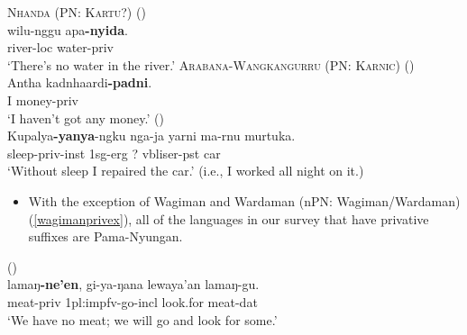 \documentclass{article}
\begin{document}


\begin{exe}
  \ex \textsc{Nhanda (PN: Kartu?)} (\citealt[64]{blevins01}) \label{privexist1}\\
  \gll wilu-nggu apa\textbf{-nyida}.\\
  river-{\sc loc} water-{\sc priv}\\
  \glt `There's no water in the river.'
  \ex \textsc{Arabana-Wangkangurru (PN: Karnic)} (\citealt[237]{hercus94})\\
  \gll Antha kadnhaardi\textbf{-padni}.\\
  I money-{\sc priv}\\
  \glt `I haven't got any money.'
   (\citealt[33]{westerlund07})\\
  \gll Kupalya\textbf{-yanya}-ngku nga-ja     yarni ma-rnu murtuka.\\
  sleep-{\sc priv-inst}     1{\sc sg-erg}  ?     {\sc vbliser-pst} car \\
  \glt `Without sleep I repaired the car.' (i.e., I worked all night on it.)
\end{exe}

\begin{itemize}
\item With the exception of Wagiman and Wardaman (nPN: Wagiman/Wardaman) (\ref{wagimanprivex}), all of the languages in our survey that have privative suffixes are Pama-Nyungan.
\end{itemize}

\begin{exe}
   (\citealt[133-134]{cook87}) \label{wagimanprivex}\\
  \gll lamaŋ\textbf{-ne'en}, gi-ya-ŋana lewaya'an lamaŋ-gu.\\
  meat-{\sc priv} 1{\sc pl:impfv}-go-{\sc incl} look.for meat-{\sc dat}\\
  \glt `We have no meat; we will go and look for some.'
\end{exe}
\end{document}
